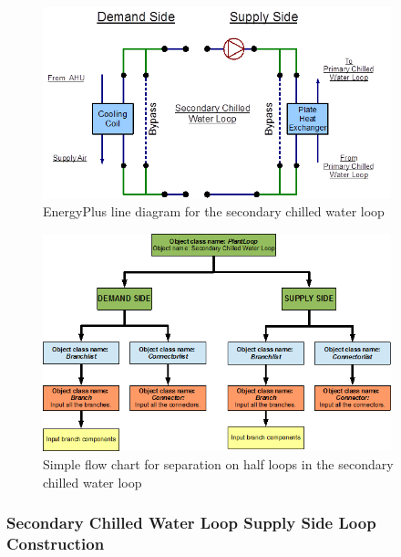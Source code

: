 \begin{figure}[hbtp] %
\centering
\includegraphics[width=0.9\textwidth, height=0.9\textheight, keepaspectratio=true]{media/image104.png}
\caption{EnergyPlus line diagram for the secondary chilled water loop \protect \label{fig:energyplus-line-diagram-for-the-secondary}}
\end{figure}

\begin{figure}[hbtp] %
\centering
\includegraphics[width=0.9\textwidth, height=0.9\textheight, keepaspectratio=true]{media/image105.png}
\caption{Simple flow chart for separation on half loops in the secondary chilled water loop \protect \label{fig:simple-flow-chart-for-separation-on-half-003}}
\end{figure}

\subsubsection{Secondary Chilled Water Loop Supply Side Loop Construction}\label{secondary-chilled-water-loop-supply-side-loop-construction}

